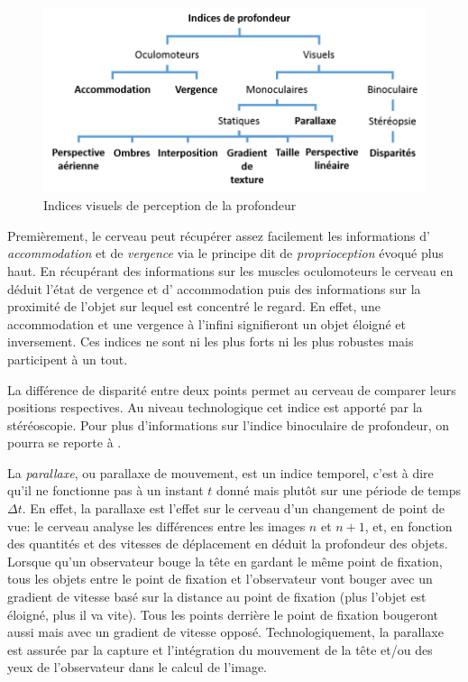 	\begin{figure}
		\centering
		\includegraphics[scale=1]{Figures/IndicesProfondeur}
		\caption{Indices visuels de perception de la profondeur}
		\label{fig:indices_profondeur}
	\end{figure}
	
	\par Premièrement, le cerveau peut récupérer assez facilement les informations d' \textit{accommodation} et de \textit{vergence} via le principe dit de \textit{proprioception} évoqué plus haut. En récupérant des informations sur les muscles oculomoteurs le cerveau en déduit l'état de vergence et d' accommodation puis des informations sur la proximité de l'objet sur lequel est concentré le regard. En effet, une accommodation et une vergence à l'infini signifieront un objet éloigné et inversement. Ces indices ne sont ni les plus forts ni les plus robustes mais participent à un tout.
	
	\par La différence de disparité entre deux points permet au cerveau de comparer leurs positions respectives. Au niveau technologique cet indice est apporté par la stéréoscopie. Pour plus d'informations sur l'indice binoculaire de profondeur, on pourra se reporte à \citep{glassner_principles_1995}.
	
	\par La \textit{parallaxe}, ou parallaxe de mouvement, est un indice temporel, c'est à dire qu'il ne fonctionne pas à un instant $t$ donné mais plutôt sur une période de temps $\Delta t$. En effet, la parallaxe est l'effet sur le cerveau d'un changement de point de vue: le cerveau analyse les différences entre les images $n$ et $n+1$, et, en fonction des quantités et des vitesses de déplacement en déduit la profondeur des objets. Lorsque qu'un observateur bouge la tête en gardant le même point de fixation, tous les objets entre le point de fixation et l'observateur vont bouger avec un gradient de vitesse basé sur la distance au point de fixation (plus l'objet est éloigné, plus il va vite). Tous les points derrière le point de fixation bougeront aussi mais avec un gradient de vitesse opposé. Technologiquement, la parallaxe est assurée par la capture et l'intégration du mouvement de la tête et/ou des yeux de l'observateur dans le calcul de l'image.
	
